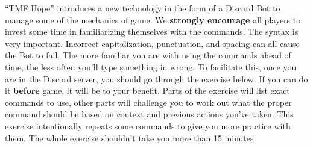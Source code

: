 \documentclass[green]{TMFHope}
\begin{document}
\name{\gDiscord{}}

``TMF Hope'' introduces a new technology in the form of a Discord Bot to manage some of the mechanics of game. We \textbf{strongly encourage} all players to invest some time in familiarizing themselves with the commands. The syntax is very important. Incorrect capitalization, punctuation, and spacing can all cause the Bot to fail. The more familiar you are with using the commands ahead of time, the less often you'll type something in wrong. To facilitate this, once you are in the Discord server, you should go through the exercise below. If you can do it \textbf{before} game, it will be to your benefit. Parts of the exercise will list exact commands to use, other parts will challenge you to work out what the proper command should be based on context and previous actions you've taken. This exercise intentionally repeats some commands to give you more practice with them. The whole exercise shouldn't take you more than 15 minutes.
\end{document}

